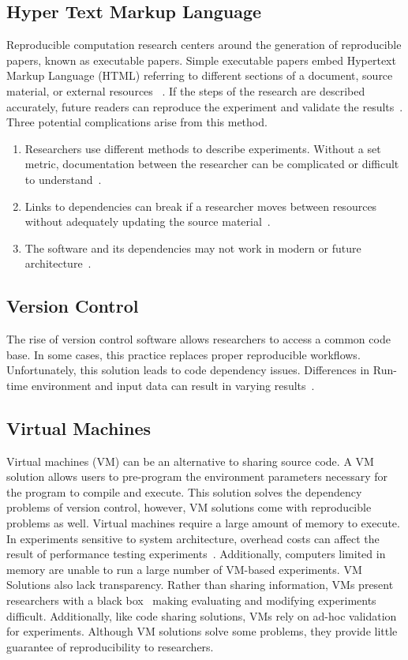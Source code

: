 \documentclass{IEEEtran}
\begin{document}
\subsection{Hyper Text Markup Language}
Reproducible computation research centers around the generation of reproducible papers, known as executable papers. Simple executable papers embed Hypertext Markup Language (HTML) referring to different sections of a document, source material, or external resources ~\cite{TESP}. If the steps of the research are described accurately, future readers can reproduce the experiment and validate the results~\cite{TESP}. Three potential complications arise from this method.
\begin{enumerate}
  \item Researchers use different methods to describe experiments. Without a set metric, documentation between the researcher can be complicated or difficult to understand~\cite{TESP}.

  \item Links to dependencies can break if a researcher moves between resources without adequately updating the source material~\cite{TESP}.
  \item The software and its dependencies may not work in modern or future architecture~\cite{TESP}.
\end{enumerate}

\subsection{Version Control}
The rise of version control software allows researchers to access a common code base. In some cases, this practice replaces proper reproducible workflows. Unfortunately, this solution leads to code dependency issues. Differences in Run-time environment and input data can result in varying results~\cite{TPC}.

\subsection{Virtual Machines }
Virtual machines (VM) can be an alternative to sharing source code. A VM solution allows users to pre-program the environment parameters necessary for the program to compile and execute. This solution solves the dependency problems of version control, however, VM solutions come with reproducible problems as well. Virtual machines require a large amount of memory to execute. In experiments sensitive to system architecture, overhead costs can affect the result of performance testing experiments~\cite{TPC}. Additionally, computers limited in memory are unable to run a large number of VM-based experiments. VM Solutions also lack transparency. Rather than sharing information, VMs present researchers with a black box~\cite{ITD} making evaluating and modifying experiments difficult. Additionally, like code sharing solutions, VMs rely on ad-hoc validation for experiments. Although VM solutions solve some problems, they provide little guarantee of reproducibility to researchers.
\end{document}
